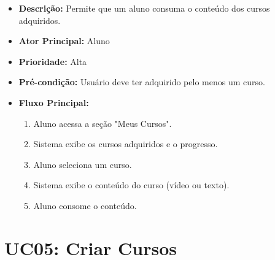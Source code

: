         \begin{itemize}
            \item \textbf{Descrição:} Permite que um aluno consuma o conteúdo dos cursos adquiridos.
            
            \item \textbf{Ator Principal:} Aluno
            
            \item \textbf{Prioridade:} Alta
            
            \item \textbf{Pré-condição:} Usuário deve ter adquirido pelo menos um curso.
            
            \item \textbf{Fluxo Principal:}
            \begin{enumerate}
                \item Aluno acessa a seção "Meus Cursos".
                \item Sistema exibe os cursos adquiridos e o progresso.
                \item Aluno seleciona um curso.
                \item Sistema exibe o conteúdo do curso (vídeo ou texto).
                \item Aluno consome o conteúdo.
            \end{enumerate}
        \end{itemize}

        \section*{UC05: Criar Cursos}

